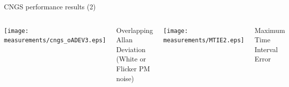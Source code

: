 \documentclass[compress,red]{beamer}
\begin{document}
\begin{frame}{CNGS performance results (2)}

  \begin{columns}[c]
		\begin{center}
		\texttt{[image: measurements/cngs\_oADEV3.eps]}
		\end{center}
		\begin{center}
		  Overlapping Allan Deviation \\
		  (White or Flicker PM noise)
		\end{center}


		\begin{center}
		\texttt{[image: measurements/MTIE2.eps]}
		\end{center}
		\begin{center}
		Maximum Time Interval Error
		\end{center}
  \end{columns}
  \begin{columns}[c]

  \end{columns}

\end{frame}
\end{document}
